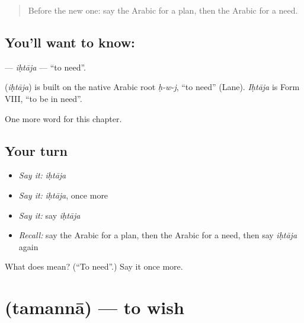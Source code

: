 \label{lesson:AR-C114-ihtaja}



\begin{quote}
Before the new one: say the Arabic for a plan, then the Arabic for a need.
\end{quote}

\subsection*{You'll want to know: }
\textbf{} — \emph{iḥtāja} — \textquotedblleft{}to need\textquotedblright{}.

\begin{cousinweb}
\textbf{} (\emph{iḥtāja}) is built on the native Arabic root \emph{ḥ-w-j}, \textquotedblleft{}to need\textquotedblright{} (Lane). \emph{Iḥtāja} is Form VIII, \textquotedblleft{}to be in need\textquotedblright{}.
\end{cousinweb}

\begin{grammarlens}[title={What you've built}]
One more word for this chapter.
\end{grammarlens}

\subsection*{Your turn}
\begin{itemize}
\raggedright
  \item \emph{Say it:} \emph{iḥtāja}
  \item \emph{Say it:} \emph{iḥtāja}, once more
  \item \emph{Say it:} say \emph{iḥtāja}
  \item \emph{Recall:} say the Arabic for a plan, then the Arabic for a need, then say \emph{iḥtāja} again
\end{itemize}

\begin{tcolorbox}[breakable,colback=teal!4,colframe=teal!35!black,title={Before you move on}]
What does  mean? (\textquotedblleft{}To need\textquotedblright{}.) Say it once more.
\end{tcolorbox}
\section[\texorpdfstring{\ar{تمنى} (tamannā)}{تمنى (tamannā)}]{ (tamannā) — to wish}

\label{lesson:AR-C114-tamanna}



